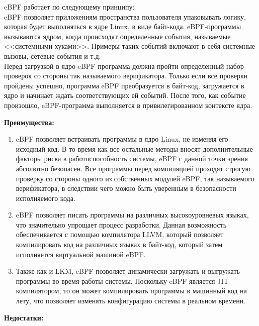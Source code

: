 
eBPF работает по следующему принципу:\\%

eBPF позволяет приложениям пространства пользователя упаковывать логику, которая будет выполняться в ядре Linux, в виде байт-кода.
eBPF-программы вызываются ядром, когда происходят определенные события, называемые <<системными хуками>>.
Примеры таких событий включают в себя системные вызовы, сетевые события и т.д.\\
Перед загрузкой в ядро eBPF-программа должна пройти определенный набор проверок со стороны так называемого верификатора.
Только если все проверки пройдены успешно, программа eBPF преобразуется в байт-код, загружается в ядро и начинает ждать соответствующих ей событий.
После того, как событие произошло, eBPF-программа выполняется в привилегированном контексте ядра.

\textbf{Преимущества:}

\begin{enumerate}
    \item eBPF позволяет встраивать программы в ядро Linux, не изменяя его исходный код.
    В то время как все остальные методы вносят дополнительные факторы риска в работоспособность системы, eBPF с данной точки зрения абсолютно безопасен.
    Все программы перед компиляцией проходят строгую проверку со стороны одного из собственных модулей eBPF, так называемого верификатора, в следствии чего можно быть уверенным в безопасности исполняемого кода.
    \item eBPF позволяет писать программы на различных высокоуровневых языках, что значительно упрощает процесс разработки.
    Данная возможность обеспечивается с помощью компилятора LLVM, который позволяет компилировать код на различных языках в байт-код, который затем исполняется виртуальной машиной eBPF.
    \item Также как и LKM, eBPF позволяет динамически загружать и выгружать программы во время работы системы. %
    Поскольку eBPF является JIT-компилятором, то он может компилировать программы в машинный код на лету, что позволяет изменять конфигурацию системы в реальном времени.
\end{enumerate}

\textbf{Недостатки:}

